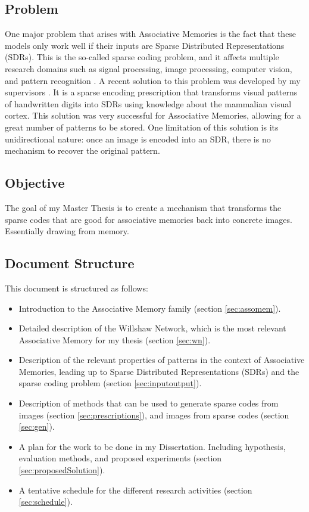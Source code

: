 \documentclass[runningheads]{llncs}
\begin{document}
\subsection{Problem}
\label{sec:intro_prob}
One major problem that arises with Associative Memories is the fact that these models only work well if their inputs are Sparse Distributed Representations (SDRs). This is the so-called sparse coding problem, and it affects multiple research domains such as signal processing, image processing, computer vision, and pattern recognition \cite{wright2008robust,yang2010image,zhang2015survey}. A recent solution to this problem was developed by my supervisors \cite{sa2019attention,sa2020storing}. It is a sparse encoding prescription that transforms visual patterns of handwritten digits into SDRs using knowledge about the mammalian visual cortex. This solution was very successful for Associative Memories, allowing for a great number of patterns to be stored. One limitation of this solution is its unidirectional nature: once an image is encoded into an SDR, there is no mechanism to recover the original pattern.
\subsection{Objective}
\label{sec:intro_obj}
The goal of my Master Thesis is to create a mechanism that transforms the sparse codes that are good for associative memories back into concrete images. Essentially drawing from memory.

\subsection{Document Structure}
\label{sec:intro_struct}
This document is structured as follows:
\begin{itemize}
    \item Introduction to the Associative Memory family (section \ref{sec:assomem}).
    \item Detailed description of the Willshaw Network, which is the most relevant Associative Memory for my thesis (section \ref{sec:wn}).
    \item Description of the relevant properties of patterns in the context of Associative Memories, leading up to Sparse Distributed Representations (SDRs) and the sparse coding problem (section \ref{sec:inputoutput}).
    \item Description of methods that can be used to generate sparse codes from images (section \ref{sec:prescriptions}), and images from sparse codes (section \ref{sec:gen}).
    \item A plan for the work to be done in my Dissertation. Including hypothesis, evaluation methods, and proposed experiments (section \ref{sec:proposedSolution}). 
    \item A tentative schedule for the different research activities (section \ref{sec:schedule}).
\end{itemize}
\end{document}
